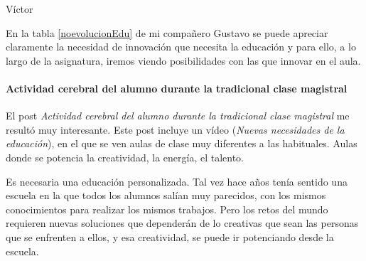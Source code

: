 \begin{opin}{\victorcolor}{Víctor}

En la tabla \ref{noevolucionEdu}  de mi compañero Gustavo se puede apreciar claramente la necesidad de innovación que necesita la educación y para ello, a lo largo de la asignatura, iremos viendo posibilidades con las que innovar en el aula.

\paragraph{Actividad cerebral del alumno durante la tradicional clase magistral}

El post \textit{Actividad cerebral del alumno durante la tradicional clase magistral} me resultó muy interesante.
%
Este post incluye un vídeo (\textit{Nuevas necesidades de la educación}), en el que se ven aulas de clase muy diferentes a las habituales. 
%
Aulas donde se potencia la creatividad, la energía, el talento.

Es necesaria una educación personalizada. 
%
Tal vez hace años tenía sentido una escuela en la que todos los alumnos salían muy parecidos, con los mismos conocimientos para realizar los mismos trabajos.
%
Pero los retos del mundo requieren nuevas soluciones que dependerán de lo creativas que sean las personas que se enfrenten a ellos, y esa creatividad, se puede ir potenciando desde la escuela.


\end{opin}

